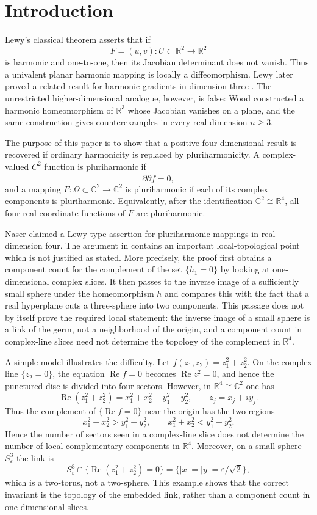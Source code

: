 \documentclass[11pt]{amsart}
\theoremstyle{definition}
\theoremstyle{remark}
\newcommand{\C}{\mathbb C}
\newcommand{\R}{\mathbb R}
\begin{document}
\section{Introduction}

Lewy's classical theorem \cite{Lewy1936} asserts that if
\[
        F=(u,v):U\subset\R^2\longrightarrow\R^2
\]
is harmonic and one-to-one, then its Jacobian determinant does not
vanish. Thus a univalent planar harmonic mapping is locally a
diffeomorphism. Lewy later proved a related result for harmonic
gradients in dimension three \cite{Lewy1968}. The unrestricted
higher-dimensional analogue, however, is false: Wood \cite{Wood1991}
constructed a harmonic homeomorphism of \(\R^3\) whose Jacobian
vanishes on a plane, and the same construction gives counterexamples in
every real dimension \(n\ge3\).

The purpose of this paper is to show that a positive four-dimensional
result is recovered if ordinary harmonicity is replaced by
pluriharmonicity. A complex-valued \(C^2\) function is pluriharmonic if
\[
        \partial\bar\partial f=0,
\]
and a mapping \(F:\Omega\subset\C^2\to\C^2\) is pluriharmonic if each
of its complex components is pluriharmonic. Equivalently, after the
identification \(\C^2\cong\R^4\), all four real coordinate functions of
\(F\) are pluriharmonic.

Naser \cite{Naser1973} claimed a Lewy-type assertion for
pluriharmonic mappings in real dimension four. The argument in
\cite{Naser1973} contains an important local-topological point which is
not justified as stated. More precisely, the proof first obtains a
component count for the complement of the set $\{h_1=0\}$ by looking at
one-dimensional complex slices. It then passes to the inverse image of a
sufficiently small sphere under the homeomorphism $h$ and compares this
with the fact that a real hyperplane cuts a three-sphere into two
components. This passage does not by itself prove the required local
statement: the inverse image of a small sphere is a link of the germ,
not a neighborhood of the origin, and a component count in complex-line
slices need not determine the topology of the complement in
$\mathbb R^4$.

A simple model illustrates the difficulty. Let
$f(z_1,z_2)=z_1^2+z_2^2$. On the complex line $\{z_2=0\}$, the equation
$\operatorname{Re} f=0$ becomes $\operatorname{Re} z_1^2=0$, and hence
the punctured disc is divided into four sectors. However, in
$\mathbb R^4\cong\mathbb C^2$ one has
\[
        \operatorname{Re}(z_1^2+z_2^2)
        =
        x_1^2+x_2^2-y_1^2-y_2^2,
        \qquad z_j=x_j+iy_j.
\]
Thus the complement of $\{\operatorname{Re} f=0\}$ near the origin has
the two regions
\[
        x_1^2+x_2^2>y_1^2+y_2^2,
        \qquad
        x_1^2+x_2^2<y_1^2+y_2^2.
\]
Hence the number of sectors seen in a complex-line slice does not
determine the number of local complementary components in
$\mathbb R^4$. Moreover, on a small sphere $S^3_\varepsilon$ the link is
\[
        S^3_\varepsilon\cap\{\operatorname{Re}(z_1^2+z_2^2)=0\}
        =
        \{|x|=|y|=\varepsilon/\sqrt 2\},
\]
which is a two-torus, not a two-sphere. This example shows that the
correct invariant is the topology of the embedded link, rather than a
component count in one-dimensional slices.
\end{document}
